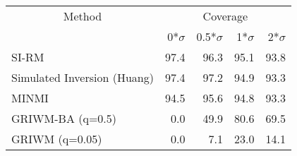 
\begin{tabular}{lrrrr}
\toprule
\multicolumn{1}{c}{Method} & \multicolumn{4}{c}{Coverage} \\
 & 0*$\sigma$ & 0.5*$\sigma$ & 1*$\sigma$ & 2*$\sigma$\\
\midrule
SI-RM & 97.4 & 96.3 & 95.1 & 93.8\\
Simulated Inversion (Huang) & 97.4 & 97.2 & 94.9 & 93.3\\
MINMI & 94.5 & 95.6 & 94.8 & 93.3\\
GRIWM-BA (q=0.5) & 0.0 & 49.9 & 80.6 & 69.5\\
GRIWM (q=0.05) & 0.0 & 7.1 & 23.0 & 14.1\\
\bottomrule
\end{tabular}
